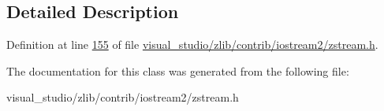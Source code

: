 \subsection{Detailed Description}


Definition at line \hyperlink{visual__studio_2zlib_2contrib_2iostream2_2zstream_8h_source_l00155}{155} of file \hyperlink{visual__studio_2zlib_2contrib_2iostream2_2zstream_8h_source}{visual\+\_\+studio/zlib/contrib/iostream2/zstream.\+h}.



The documentation for this class was generated from the following file\+:\begin{DoxyCompactItemize}
\item 
visual\+\_\+studio/zlib/contrib/iostream2/zstream.\+h\end{DoxyCompactItemize}

